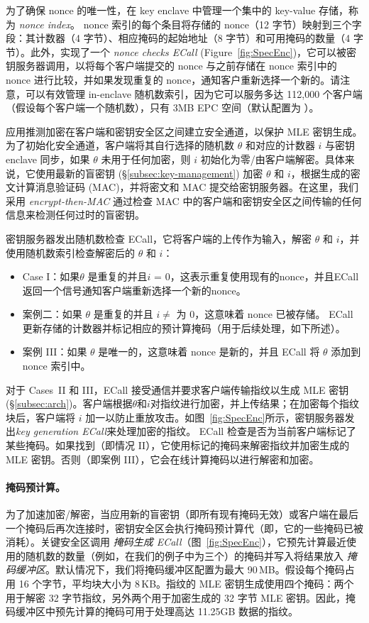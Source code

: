 为了确保 nonce 的唯一性，\sysname 在 key enclave 中管理一个集中的 key-value 存储，称为 {\em nonce index}。 nonce 索引的每个条目将存储的 nonce（12 字节）映射到三个字段：其计数器（4 字节）、相应掩码的起始地址（8 字节）和可用掩码的数量（4 字节）。此外，\sysname 实现了一个 {\em nonce checks ECall} (Figure~\ref{fig:SpecEnc})，它可以被密钥服务器调用，以将每个客户端提交的 nonce 与之前存储在 nonce 索引中的 nonce 进行比较，并如果发现重复的 nonce，通知客户重新选择一个新的。请注意，可以有效管理 in-enclave 随机数索引，因为它可以服务多达 112,000 个客户端（假设每个客户端一个随机数），只有 3MB EPC 空间（默认配置为 \sysname）。

\sysname 应用推测加密在客户端和密钥安全区之间建立安全通道，以保护 MLE 密钥生成。为了初始化安全通道，客户端将其自行选择的随机数 $\theta$ 和对应的计数器 $i$ 与密钥 enclave 同步，如果 $\theta$ 未用于任何加密，则 $i$ 初始化为零/由客户端解密。具体来说，它使用最新的盲密钥 (\S\ref{subsec:key-management}) 加密 $\theta$ 和 $i$，根据生成的密文计算消息验证码 (MAC)，并将密文和 MAC 提交给密钥服务器。在这里，我们采用 {\em encrypt-then-MAC} \cite{bellare00} 通过检查 MAC 中的客户端和密钥安全区之间传输的任何信息来检测任何过时的盲密钥。

密钥服务器发出随机数检查 ECall，它将客户端的上传作为输入，解密 $\theta$ 和 $i$，并使用随机数索引检查解密后的 $\theta$ 和 $i$：
%
\begin{itemize}[leftmargin=*]
\item Case I：如果$\theta$ 是重复的并且$i$ = 0，这表示重复使用现有的nonce，并且ECall 返回一个信号通知客户端重新选择一个新的nonce。
\item 案例二：如果 $\theta$ 是重复的并且 $i \neq$ 为 0，这意味着 nonce 已被存储。 ECall 更新存储的计数器并标记相应的预计算掩码（用于后续处理，如下所述）。
\item 案例 III：如果 $\theta$ 是唯一的，这意味着 nonce 是新的，并且 ECall 将 $\theta$ 添加到 nonce 索引中。
\end{itemize}

对于 Cases~II 和 III，ECall 接受通信并要求客户端传输指纹以生成 MLE 密钥 (\S\ref{subsec:arch})。客户端根据$\theta$和$i$对指纹进行加密，并上​​传结果；在加密每个指纹块后，客户端将 $i$ 加一以防止重放攻击。如图~\ref{fig:SpecEnc}所示，密钥服务器发出{\em key generation ECall}来处理加密的指纹。 ECall 检查是否为当前客户端标记了某些掩码。如果找到（即情况 II），它使用标记的掩码来解密指纹并加密生成的 MLE 密钥。否则（即案例 III），它会在线计算掩码以进行解密和加密。

\paragraph{掩码预计算。} 为了加速加密/解密，当应用新的盲密钥（即所有现有掩码无效）或客户端在最后一个掩码后再次连接时，密钥安全区会执行掩码预计算代（即，它的一些掩码已被消耗）。关键安全区调用 {\em 掩码生成 ECall}（图~\ref{fig:SpecEnc}），它预先计算最近使用的随机数的数量（例如，在我们的例子中为三个）的掩码并写入将结果放入 {\em 掩码缓冲区}。默认情况下，我们将掩码缓冲区配置为最大 90\,MB。假设每个掩码占用 16 个字节，平均块大小为 8\,KB。指纹的 MLE 密钥生成使用四个掩码：两个用于解密 32 字节指纹，另外两个用于加密生成的 32 字节 MLE 密钥。因此，掩码缓冲区中预先计算的掩码可用于处理高达 11.25GB 数据的指纹。
